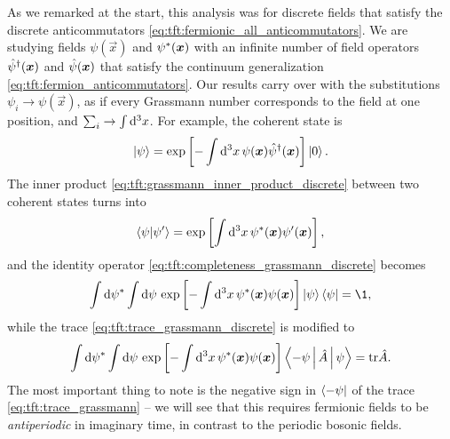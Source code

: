 As we remarked at the start, this analysis was for discrete fields that satisfy the discrete anticommutators \eqref{eq:tft:fermionic_all_anticommutators}.
We are studying fields $\psi(\vec{x})$ and ${\psi}^*({\bm{x}})$ with an infinite number of field operators $\hat\psi^\dagger({\bm{x}})$ and $\hat\psi({\bm{x}})$ that satisfy the continuum generalization \eqref{eq:tft:fermion_anticommutators}.
Our results carry over with the substitutions $\psi_i \rightarrow \psi(\vec{x})$, as if every Grassmann number corresponds to the field at one position, and $\sum_i \rightarrow \int \mathop{}\!\mathrm{d}^3 x$.
For example, the coherent state is
\begin{equation}
	\ket{\psi} = \exp \left[ -\int \mathop{}\!\mathrm{d}^3 x\, \psi({\bm{x}}) \hat\psi^\dagger({\bm{x}}) \right] \ket{0} .
\end{equation}
The inner product \eqref{eq:tft:grassmann_inner_product_discrete} between two coherent states turns into
\begin{equation}
	\braket{\psi | \psi'} = \exp \left[ \int \mathop{}\!\mathrm{d}^3 x \, {\psi}^*({\bm{x}}) \psi'({\bm{x}}) \right] ,
\label{eq:tft:grassmann_inner_product}
\end{equation}
and the identity operator \eqref{eq:tft:completeness_grassmann_discrete} becomes
\begin{equation}
	\int \dif \conj\psi \int \dif \psi \, \exp \left[ -\int \dif^3 x \, \conj\psi(\vec{x}) \psi(\vec{x}) \right] \ket{\psi} \bra{\psi} = \1 ,
\label{eq:tft:completeness_grassmann}
\end{equation}
while the trace \eqref{eq:tft:trace_grassmann_discrete} is modified to 
\begin{equation}
	\int \mathop{}\!\mathrm{d} {\psi}^* \int \mathop{}\!\mathrm{d} \psi \, \exp \left[ -\int \mathop{}\!\mathrm{d}^3 x \, {\psi}^*({\bm{x}}) \psi({\bm{x}}) \right] \Braket{-\psi | \hat{A} | \psi} = \text{tr} \hat{A} .
\label{eq:tft:trace_grassmann}
\end{equation}
The most important thing to note is the negative sign in $\bra{-\psi}$ of the trace \eqref{eq:tft:trace_grassmann} -- we will see that this requires fermionic fields to be \emph{antiperiodic} in imaginary time, in contrast to the periodic bosonic fields.

